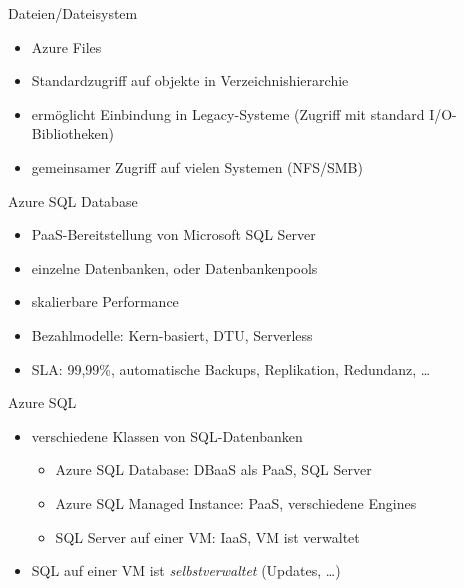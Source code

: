 \begin{flashcard}[Definition]{Dateien/Dateisystem}
  \begin{itemize}
    \item Azure Files
    \item Standardzugriff auf objekte in Verzeichnishierarchie
    \item ermöglicht Einbindung in Legacy-Systeme\newline
    (Zugriff mit standard I/O-Bibliotheken)
    \item gemeinsamer Zugriff auf vielen Systemen (NFS/SMB)
  \end{itemize}
\end{flashcard}

\begin{flashcard}[Definition]{Azure SQL Database}
  \begin{itemize}
    \item PaaS-Bereitstellung von Microsoft SQL Server
    \item einzelne Datenbanken, oder Datenbankenpools
    \item skalierbare Performance
    \item Bezahlmodelle: Kern-basiert, DTU, Serverless
    \item SLA: 99,99\%, automatische Backups, Replikation, Redundanz, \ldots
  \end{itemize}
\end{flashcard}

\begin{flashcard}[Definition]{Azure SQL}
  \begin{itemize}
    \item verschiedene Klassen von SQL-Datenbanken
      \begin{itemize}
        \item Azure SQL Database: DBaaS als PaaS, SQL Server
        \item Azure SQL Managed Instance: PaaS, verschiedene Engines
          \item SQL Server auf einer VM: IaaS, VM ist verwaltet
      \end{itemize}
      \item SQL auf einer VM ist \emph{selbstverwaltet} (Updates, \ldots)
  \end{itemize}
\end{flashcard}

